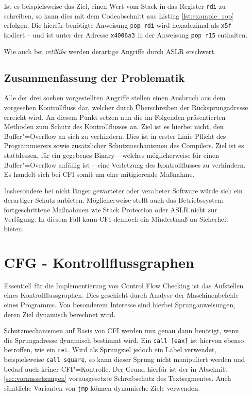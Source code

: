 \documentclass[12pt,%
               oneside,
               a4paper]{uiothesis}
\begin{document}
Ist es beispielsweise das Ziel, einen Wert vom Stack in das Register \texttt{rdi} zu schreiben, so kann dies mit dem Codeabschnitt aus Listing \ref{lst:example_rop} erfolgen. Die hierfür benötigte Anweisung \texttt{pop rdi} wird hexadezimal als \texttt{x5f} kodiert -- und ist unter der Adresse \texttt{x4006a3} in der Anweisung \texttt{pop r15} enthalten.

Wie auch bei \emph{ret2libc} werden derartige Angriffe durch ASLR erschwert.

\subsection{Zusammenfassung der Problematik}

Alle der drei soeben vorgestellten Angriffe stellen einen Ausbruch aus dem vorgesehen Kontrollfluss dar, welcher durch Überschreiben der Rücksprungadresse erreicht wird. An diesem Punkt setzen nun die im Folgenden präsentierten Methoden zum Schutz des Kontrollflusses an. Ziel ist es hierbei nicht, den Buffer"=Overflow an sich zu verhindern. Dies ist in erster Linie Pflicht des Programmierers sowie zusätzlicher Schutzmechanismen des Compilers. Ziel ist es stattdessen, für ein gegebenes Binary -- welches möglicherweise für einen Buffer"=Overflow anfällig ist -- eine Verletzung des Kontrollflusses zu verhindern. Es handelt sich bei CFI somit um eine mitigierende Maßnahme.


Insbesondere bei nicht länger gewarteter oder veralteter Software würde sich ein derartiger Schutz anbieten. Möglicherweise stellt auch das Betriebssystem fortgeschrittene Maßnahmen wie Stack Protection oder ASLR nicht zur Verfügung. In diesem Fall kann CFI dennoch ein Mindestmaß an Sicherheit bieten.


\section{CFG - Kontrollflussgraphen}

Essentiell für die Implementierung von Control Flow Checking ist das Aufstellen eines Kontrollflussgraphen. Dies geschieht durch Analyse der Maschinenbefehle eines Programms. Von besonderem Interesse sind hierbei Sprunganweisungen, deren Ziel dynamisch berechnet wird.

Schutzmechanismen auf Basis von CFI werden nun genau dann benötigt, wenn die Sprungadresse dynamisch bestimmt wird. Ein \texttt{call [eax]} ist hiervon ebenso betroffen, wie ein \texttt{ret}. Wird als Sprungziel jedoch ein Label verwendet, beispielsweise \texttt{call square}, so kann dieser Sprung nicht manipuliert werden und bedarf auch keiner CFI"=Kontrolle. Der Grund hierfür ist der in Abschnitt \ref{sec:voraussetzungen} vorausgesetzte Schreibschutz des Textsegmentes. Auch sämtliche Varianten von \texttt{jmp} können dynamische Ziele verwenden.
\end{document}
